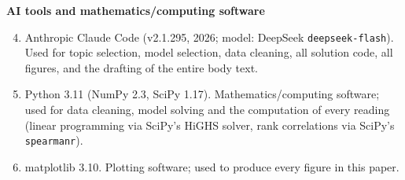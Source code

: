 \noindent\textbf{AI tools and mathematics/computing software}\par
\begin{enumerate}
  \setcounter{enumi}{3}
  \item Anthropic Claude Code (v2.1.295, 2026; model: DeepSeek \texttt{deepseek-flash}). Used for topic selection, model selection, data cleaning, all solution code, all figures, and the drafting of the entire body text.
  \item Python 3.11 (NumPy 2.3, SciPy 1.17). Mathematics/computing software; used for data cleaning, model solving and the computation of every reading (linear programming via SciPy's HiGHS solver, rank correlations via SciPy's \texttt{spearmanr}).
  \item matplotlib 3.10. Plotting software; used to produce every figure in this paper.
\end{enumerate}


